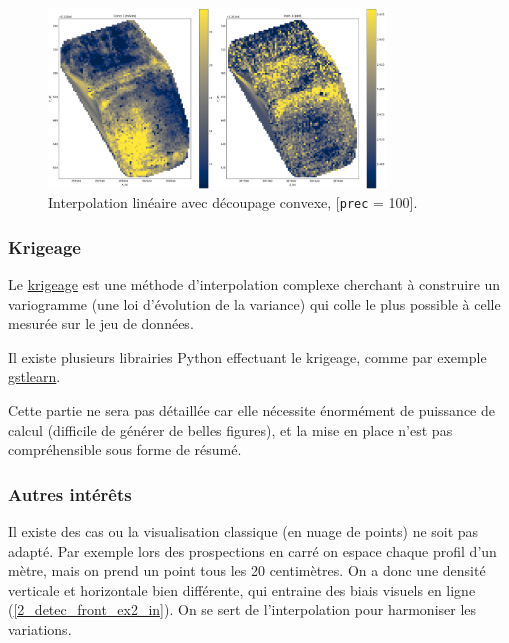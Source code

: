 \documentclass[12pt]{article}
\begin{document}
    \begin{figure}[ht!]
        \centering
        \includegraphics[width=0.8\textwidth]{Images/Grid_Interplin_r1c1p100_nocrop.png}
        \caption{Interpolation linéaire avec découpage convexe, [\texttt{prec} = 100].}
    \end{figure}

\subsubsection{Krigeage}

    Le \href{https://www.publichealth.columbia.edu/research/population-health-methods/kriging-interpolation#:~:text=Kriging%20is%20one%20of%20several,over%20a%20continuous%20spatial%20field.}{krigeage} est une méthode d'interpolation complexe cherchant à construire un variogramme (une loi d'évolution de la variance) qui colle le plus possible à celle mesurée sur le jeu de données.

    Il existe plusieurs librairies Python effectuant le krigeage, comme par exemple \href{https://gstlearn.org/}{gstlearn}.

    Cette partie ne sera pas détaillée car elle nécessite énormément de puissance de calcul (difficile de générer de belles figures), et la mise en place n'est pas compréhensible sous forme de résumé.

\subsubsection{Autres intérêts}

    Il existe des cas ou la visualisation classique (en nuage de points) ne soit pas adapté. Par exemple lors des prospections en carré on espace chaque profil d'un mètre, mais on prend un point tous les 20 centimètres. On a donc une densité verticale et horizontale bien différente, qui entraine des biais visuels en ligne (\ref{2_detec_front_ex2_in}). On se sert de l'interpolation pour harmoniser les variations.
\end{document}
